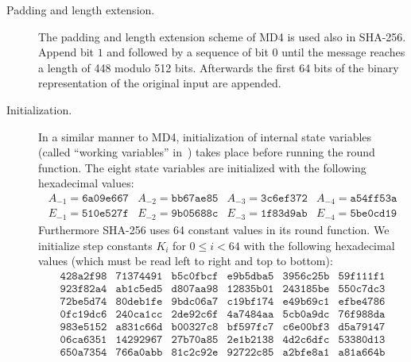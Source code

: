 %
\begin{description}
  \item[Padding and length extension.]
    The padding and length extension scheme of MD4 is used also in SHA-256.
    Append bit $1$ and followed by a sequence of bit $0$ until the message reaches a length
    of 448 modulo 512 bits. Afterwards the first 64 bits of the binary representation
    of the original input are appended.
  \item[Initialization.]
    In a similar manner to MD4, initialization of internal state variables
    (called \enquote{working variables} in~\cite[Section~6.2.2]{fips-pub-180-4})
    takes place before running the round function. The eight state variables
    are initialized with the following hexadecimal values:
    \[
      \begin{array}{llll}
        A_{-1} = \texttt{6a09e667} &
        A_{-2} = \texttt{bb67ae85} &
        A_{-3} = \texttt{3c6ef372} &
        A_{-4} = \texttt{a54ff53a} \\
        E_{-1} = \texttt{510e527f} &
        E_{-2} = \texttt{9b05688c} &
        E_{-3} = \texttt{1f83d9ab} &
        E_{-4} = \texttt{5be0cd19}
      \end{array}
    \]
    Furthermore SHA-256 uses 64 constant values in its round function.
    We initialize step constants $K_i$ for $0 \leq i < 64$ with the following hexadecimal
    values (which must be read left to right and top to bottom):
    \[
      \begin{array}{cccccc}
        \texttt{428a2f98} & \texttt{71374491} & \texttt{b5c0fbcf} & \texttt{e9b5dba5} & \texttt{3956c25b} & \texttt{59f111f1} \\
        \texttt{923f82a4} & \texttt{ab1c5ed5} & \texttt{d807aa98} & \texttt{12835b01} & \texttt{243185be} & \texttt{550c7dc3} \\
        \texttt{72be5d74} & \texttt{80deb1fe} & \texttt{9bdc06a7} & \texttt{c19bf174} & \texttt{e49b69c1} & \texttt{efbe4786} \\
        \texttt{0fc19dc6} & \texttt{240ca1cc} & \texttt{2de92c6f} & \texttt{4a7484aa} & \texttt{5cb0a9dc} & \texttt{76f988da} \\
        \texttt{983e5152} & \texttt{a831c66d} & \texttt{b00327c8} & \texttt{bf597fc7} & \texttt{c6e00bf3} & \texttt{d5a79147} \\
        \texttt{06ca6351} & \texttt{14292967} & \texttt{27b70a85} & \texttt{2e1b2138} & \texttt{4d2c6dfc} & \texttt{53380d13} \\
        \texttt{650a7354} & \texttt{766a0abb} & \texttt{81c2c92e} & \texttt{92722c85} & \texttt{a2bfe8a1} & \texttt{a81a664b} \\

\end{array}\]
\end{description}
